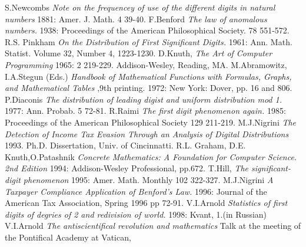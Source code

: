 \documentclass[titlepage,fleqn]{article}%
\begin{document}
\begin{thebibliography}{1}
 S.Newcombs {\em
Note on the frequencey of use of the different
digits in natural numbers } 1881: Amer. J. Math. 4 39-40.
 F.Benford {\em The law of anomalous numbers.}
1938: Proceedings of the American Philosophical Society. 78 551-572.
 R.S. Pinkham  {\em
On the Distribution of First Significant Digits.}
1961: Ann. Math. Statist. Volume 32, Number 4, 1223-1230.
 D.Knuth, {\em The Art of Computer Programming}
1965: 2 219-229.
Addison-Wesley, Reading, MA.
 M.Abramowitz, I.A.Stegun (Eds.){\em
Handbook of Mathematical Functions with Formulas, Graphs, and Mathematical Tables}%
,9th printing.
1972: New York: Dover, pp. 16 and 806.
 P.Diaconis {\em
The distribution of leading digist and uniform distribution mod 1.}
1977: Ann. Probab. 5 72-81.
 R.Raimi {\em The first digit
phenomenon again.} 1985: Proceedings
of the American Philosophical Society 129 211-219.
 M.J.Nigrini {\em The Detection of Income Tax Evasion
Through an Analysis of Digital Distributions}
1993. Ph.D. Dissertation, Univ. of Cincinnatti.
 R.L. Graham, D.E. Knuth,O.Patashnik
{\em Concrete Mathematics: A Foundation for Computer Science. 2nd Edition}
1994: Addison-Wesley Professional,
pp.672.
 T.Hill,{ \em The significant-digit phenomenon }
1995: Amer. Math.
Monthly 102 322-327.
 M.J.Nigrini {\em
A Taxpayer Compliance Application of Benford's Law.}
1996: Journal of the American Tax Association, Spring 1996 pp 72-91.
 V.I.Arnold {\em
Statistics of first digits of degries of 2 and redivision of world.}
1998: Kvant, 1.(in Russian)
 V.I.Arnold
{\em The antiscientifical revolution and mathematics}
Talk at the meeting of the Pontifical Academy at Vatican,

\end{thebibliography}
\end{document}
